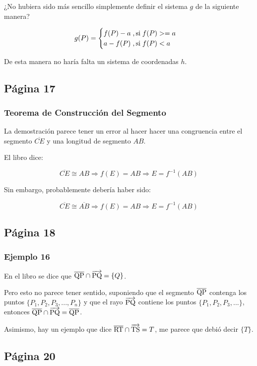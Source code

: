 ¿No hubiera sido más sencillo simplemente definir el sistema $g$ de la siguiente manera?

\[
g(P) = \begin{cases}
            f(P)-a \; \text{,\,si} \; f(P) >= a \\
            a-f(P) \; \text{,\,si} \; f(P) < a
        \end{cases}    
\]

De esta manera no haría falta un sistema de coordenadas \(h\).

\subsection{Página 17}
\subsubsection{Teorema de Construcción del Segmento}

La demostración parece tener un error al hacer hacer una congruencia entre el segmento \(\overline{CE}\) y una longitud de segmento \(AB\).

El libro dice:

\[\overline{CE} \cong AB \Rightarrow f(E) = AB \Rightarrow E = f^{-1}(AB)\]

Sin embargo, probablemente debería haber sido:

\[\overline{CE} \cong \overline{AB} \Rightarrow f(E) = AB \Rightarrow E = f^{-1}(AB)\]

\subsection{Página 18}
\subsubsection{Ejemplo 16}

En el libro se dice que \(\overline{\rm QP} \cap  \overrightarrow{\rm PQ} = \left\{Q\right\}\).

Pero esto no parece tener sentido, suponiendo que el segmento \(\overline{\rm QP}\) contenga los puntos \(\{P_1,P_2,P_3,...,P_n\}\) y que el rayo \(\overrightarrow{\rm PQ}\) contiene los puntos \(\{P_1,P_2,P_3,...\}\), entonces \(\overline{\rm QP} \cap \overrightarrow{\rm PQ} = \overline{\rm QP}\).

Asimismo, hay un ejemplo que dice \(\overline{\rm RT} \cap \overrightarrow{\rm TS} = T\), me parece que debió decir \(\{T\}\).

\subsection{Página 20}
